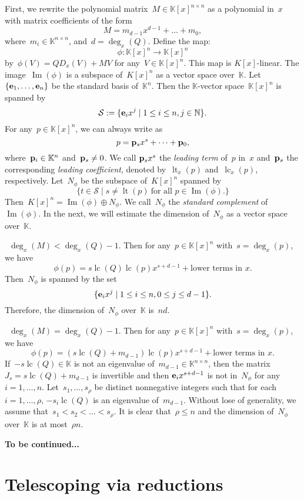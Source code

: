 \documentclass{sig-alternate}
\newcommand{\red}{\color{red}}
\newcommand{\bN}{ {\mathbb N}}
\newcommand{\bK}{ {\mathbb K}}
\newcommand{\cS}{ {\mathcal S}}
\newcommand{\ve} {{\bf e}}
\newcommand{\vp} {{\bf p}}
\def\lc{\operatorname{lc}}
\def\lt{\operatorname{lt}}
\def\im{\operatorname{Im}}
\begin{document}
First, we rewrite the polynomial matrix~$M\in \bK[x]^{n\times n}$ as a polynomial in~$x$
with matrix coefficients of the form
\[M = m_{d-1}x^{d-1} + \ldots + m_0, \]
where~$m_i\in \bK^{n\times n}$, and~$d = \deg_x(Q)$. Define the map:
\[\phi: \bK[x]^n \rightarrow \bK[x]^n\]
by~$\phi(V)= QD_x(V) + MV$ for any~$V\in \bK[x]^n$. This map is $K[x]$-linear.
The image~$\im(\phi)$ is a subspace of~$K[x]^n$ as a vector space over~$\bK$.
Let~$\{\ve_1, \ldots, \ve_n\}$ be the standard basis of~$\bK^n$. Then the $\bK$-vector space~$\bK[x]^n$
is spanned by
\[\cS := \{\ve_ix^j \mid 1\leq i \leq n, j\in \bN\}.\]
For any~$p \in \bK[x]^n$, we can always write as
\[p = \vp_sx^s + \cdots + \vp_0,\]
where~$\vp_i\in \bK^n$ and~$\vp_s \neq 0$. We call $\vp_sx^s$
the \emph{leading term} of~$p$ in~$x$ and~$\vp_s$ the corresponding \emph{leading coefficient},
denoted by~$\lt_x(p)$ and~$\lc_x(p)$, respectively.
Let~$N_\phi$ be the subspace of~$K[x]^n$ spanned by
\[\{t \in \cS \mid s\neq \lt(p) ~\text{for all~$p\in \im(\phi)$}. \}\]
Then~$K[x]^n = \im(\phi) \oplus N_\phi$.
We call~$N_{\phi}$ the \emph{standard complement} of~$\im(\phi)$.
In the next, we will estimate the dimension of~$N_\phi$ as a vector space over~$\bK$.

{\red  {\bf This part is to be revised!!!} ~$\deg_x(M)<\deg_x(Q)-1$. Then for any~$p\in \bK[x]^n$ with~$s=\deg_x(p)$, we have
\[\phi(p) = s\lc(Q)\lc(p)x^{s+d-1}+\text{lower terms in~$x$}.\]
Then~$N_\phi$ is spanned by the set
\[\{\ve_ix^j \mid 1\leq i \leq n, 0\leq j \leq d-1\}.\]
Therefore, the dimension of~$N_{\phi}$ over~$\bK$ is~$nd$.

~$\deg_x(M)=\deg_x(Q)-1$. Then for any~$p\in \bK[x]^n$ with~$s=\deg_x(p)$, we have
\[\phi(p) = (s\lc(Q) + m_{d-1})\lc(p)x^{s+d-1}+\text{lower terms in~$x$}.\]
If~$-s\lc(Q)\in \bK$ is not an eigenvalue of~$m_{d-1}\in \bK^{n\times n}$, then
the matrix~$J_s = s\lc(Q) + m_{d-1}$ is invertible and then $\ve_ix^{s+d-1}$ is not in~$N_\phi$
for any~$i=1, \ldots, n$. Let~$s_1, \ldots, s_\rho$ be distinct nonnegative integers such that
for each~$i=1, \ldots, \rho$, $-s_i\lc(Q)$ is an eigenvalue of~$m_{d-1}$. Without lose of generality,
we assume that~$s_1 <s_2<\ldots<s_\rho$. It is clear that~$\rho \leq n$
and the dimension of~$N_{\phi}$ over~$\bK$ is at most~$\rho n$.

{\bf To be continued...}}
\section{Telescoping via reductions}\label{SECT:ct}

%


\end{document}
